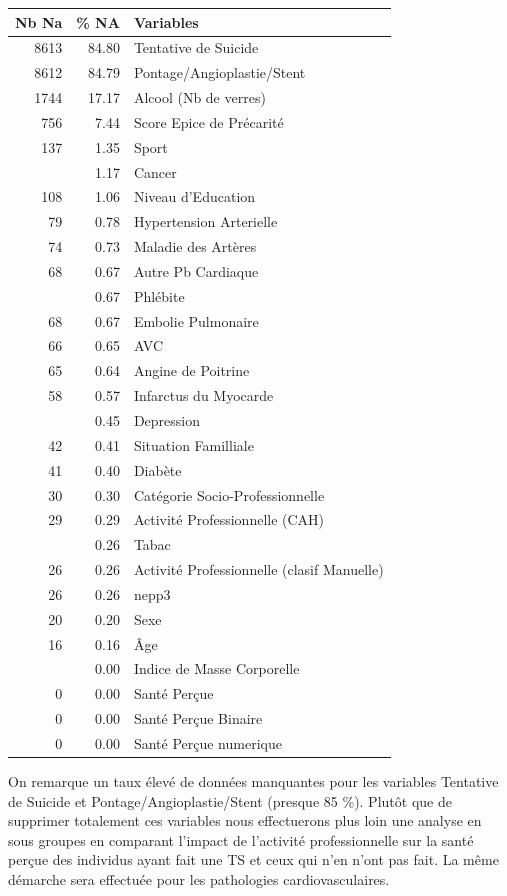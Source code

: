 \documentclass{book}
\begin{document}
\begin{center}
\begin{tabular}{rrl}
\toprule
Nb Na & \% NA & Variables\\
\midrule
8613 & 84.80 & Tentative de Suicide\\
8612 & 84.79 & Pontage/Angioplastie/Stent\\
1744 & 17.17 & Alcool (Nb de verres)\\
756 & 7.44 & Score Epice de Précarité\\
137 & 1.35 & Sport\\
\addlinespace
119 & 1.17 & Cancer\\
108 & 1.06 & Niveau d'Education\\
79 & 0.78 & Hypertension Arterielle\\
74 & 0.73 & Maladie des Artères\\
68 & 0.67 & Autre Pb Cardiaque\\
\addlinespace
68 & 0.67 & Phlébite\\
68 & 0.67 & Embolie Pulmonaire\\
66 & 0.65 & AVC\\
65 & 0.64 & Angine de Poitrine\\
58 & 0.57 & Infarctus du Myocarde\\
\addlinespace
46 & 0.45 & Depression\\
42 & 0.41 & Situation Familliale\\
41 & 0.40 & Diabète\\
30 & 0.30 & Catégorie Socio-Professionnelle\\
29 & 0.29 & Activité Professionnelle (CAH)\\
\addlinespace
26 & 0.26 & Tabac\\
26 & 0.26 & Activité Professionnelle (clasif Manuelle)\\
26 & 0.26 & nepp3\\
20 & 0.20 & Sexe\\
16 & 0.16 & Âge\\
\addlinespace
0 & 0.00 & Indice de Masse Corporelle\\
0 & 0.00 & Santé Perçue\\
0 & 0.00 & Santé Perçue Binaire\\
0 & 0.00 & Santé Perçue numerique\\
\bottomrule
\end{tabular}
\end{center}

\bigskip
\noindent
On remarque un taux élevé de données manquantes pour les variables Tentative de Suicide et Pontage/Angioplastie/Stent (presque 85 $\%$). Plutôt que de supprimer totalement ces variables nous effectuerons plus loin une analyse en sous groupes en comparant l'impact de l'activité professionnelle sur la santé perçue des individus ayant fait une TS et ceux qui n'en n'ont pas fait. La même démarche sera effectuée pour les pathologies cardiovasculaires. \\
\end{document}
